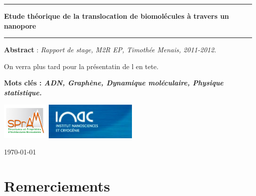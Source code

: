 \documentclass[a4paper,11pt]{article}
\begin{document}
\begin{center}

\vspace{1.5cm}

\rule[11pt]{5cm}{0.5pt}

\textbf{\huge Etude théorique de la translocation de
biomolécules à travers un nanopore}

\rule{5cm}{0.5pt}

\vspace{1.5cm}

\parbox{15cm}{\small
\textbf{Abstract} : \it Rapport de stage, M2R EP, Timothée Menais, 2011-2012.

\vspace{0.5cm}
\rm On verra plus tard pour la présentatin de l en tete.
} %


\vspace{0.5cm}

\parbox{15cm}{
\textbf{Mots clés : \it ADN, Graphène, Dynamique moléculaire, Physique statistique.} }%



\includegraphics[height=1.8cm]{spram.jpg} \hspace{0.3cm}
\includegraphics[height=1.8cm]{inac.jpg}

\end{center}


\begin{flushright}
\today
\end{flushright}

\vfill
\hfill 




\setlength{\parindent}{10pt}

\newpage

\section*{Remerciements}
\end{document}
